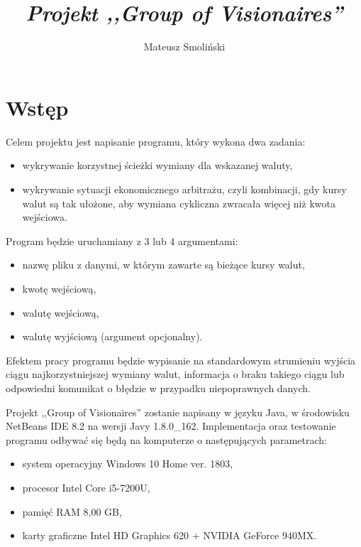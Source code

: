 \documentclass[a4paper,11pt]{article}
\title{ \sc{Specyfikacja funkcjonalna} \\
\emph{Projekt ,,Group of Visionaires''} }
\author{Mateusz Smoliński}
\newcommand\tab[1][0.6cm]{\hspace*{#1}}
\begin{document}
\maketitle

\thispagestyle{empty}

\tableofcontents

\newpage

\section{Wstęp}

\tab Celem projektu jest napisanie programu, który wykona dwa zadania: 

\begin{itemize}
\item wykrywanie korzystnej ścieżki wymiany dla wskazanej waluty,
\item wykrywanie sytuacji ekonomicznego arbitrażu, czyli kombinacji, gdy kursy walut są tak ułożone, aby wymiana cykliczna zwracała więcej niż kwota wejściowa.
\end{itemize}

Program będzie uruchamiany z 3 lub 4 argumentami:

\begin{itemize}
\item nazwę pliku z danymi, w którym zawarte są bieżące kursy walut,
\item kwotę wejściową,
\item walutę wejściową,
\item walutę wyjściową (argument opcjonalny).
\end{itemize}

Efektem pracy programu będzie wypisanie na standardowym strumieniu wyjścia ciągu najkorzystniejszej wymiany walut, informacja o braku takiego ciągu lub odpowiedni komunikat o błędzie w przypadku niepoprawnych danych.

Projekt ,,Group of Visionaires'' zostanie napisany w języku Java, w środowisku NetBeans IDE 8.2 na wersji Javy 1.8.0\_162. Implementacja oraz testowanie programu odbywać się będą na komputerze o następujących parametrach: 
\begin{itemize}

\item system operacyjny Windows 10 Home ver. 1803,
\item procesor Intel Core i5-7200U,
\item pamięć RAM 8,00 GB,
\item karty graficzne Intel HD Graphics 620 + NVIDIA GeForce 940MX.

\end{itemize}
\end{document}
